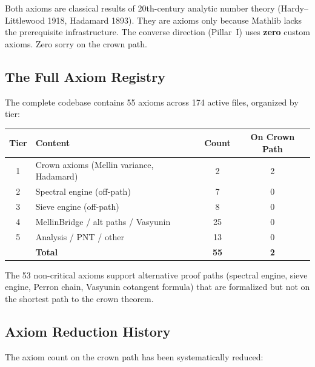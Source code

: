\documentclass[11pt,a4paper]{article}
\begin{document}
Both axioms are classical results of 20th-century analytic number theory
(Hardy--Littlewood 1918, Hadamard 1893). They are axioms only because
Mathlib lacks the prerequisite infrastructure.
The converse direction (Pillar~I) uses \textbf{zero} custom axioms.
Zero sorry on the crown path.

\subsection{The Full Axiom Registry}

The complete codebase contains 55 axioms across 174 active files,
organized by tier:

\begin{center}
\begin{tabular}{@{}clcc@{}}
\toprule
\textbf{Tier} & \textbf{Content} & \textbf{Count} & \textbf{On Crown Path} \\
\midrule
1 & Crown axioms (Mellin variance, Hadamard) & 2 & 2 \\
2 & Spectral engine (off-path) & 7 & 0 \\
3 & Sieve engine (off-path) & 8 & 0 \\
4 & MellinBridge / alt paths / Vasyunin & 25 & 0 \\
5 & Analysis / PNT / other & 13 & 0 \\
\midrule
& \textbf{Total} & \textbf{55} & \textbf{2} \\
\bottomrule
\end{tabular}
\end{center}

The 53 non-critical axioms support alternative proof paths
(spectral engine, sieve engine, Perron chain, Vasyunin cotangent formula)
that are formalized but not on the shortest path to the crown theorem.

\subsection{Axiom Reduction History}

The axiom count on the crown path has been systematically reduced:
\end{document}
